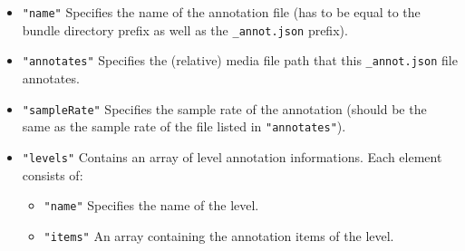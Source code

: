 \documentclass[]{book}
\theoremstyle{definition}
\theoremstyle{definition}
\theoremstyle{definition}
\theoremstyle{remark}
\begin{document}
\begin{itemize}
\item
  \texttt{"name"} Specifies the name of the annotation file (has to be
  equal to the bundle directory prefix as well as the
  \texttt{\_annot.json} prefix).
\item
  \texttt{"annotates"} Specifies the (relative) media file path that
  this \texttt{\_annot.json} file annotates.
\item
  \texttt{"sampleRate"} Specifies the sample rate of the annotation
  (should be the same as the sample rate of the file listed in
  \texttt{"annotates"}).
\item
  \texttt{"levels"} Contains an array of level annotation informations.
  Each element consists of:

  \begin{itemize}
  \item
    \texttt{"name"} Specifies the name of the level.
  \item
    \texttt{"items"} An array containing the annotation items of the
    level.


\end{itemize}
\end{itemize}
\end{document}
